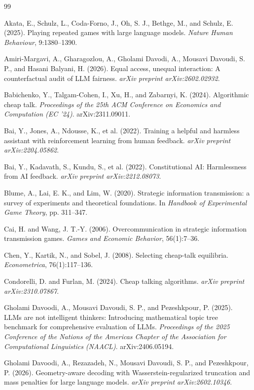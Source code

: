 \documentclass[11pt]{article}
\begin{document}
\begin{thebibliography}{99}
\raggedright

Akata, E., Schulz, L., Coda-Forno, J., Oh, S. J., Bethge, M., and Schulz, E. (2025).
Playing repeated games with large language models.
\emph{Nature Human Behaviour}, 9:1380--1390.

Amiri-Margavi, A., Gharagozlou, A., Gholami Davodi, A., Mousavi Davoudi, S. P., and Hasani Balyani, H. (2026).
Equal access, unequal interaction: A counterfactual audit of LLM fairness.
\emph{arXiv preprint arXiv:2602.02932}.

Babichenko, Y., Talgam-Cohen, I., Xu, H., and Zabarnyi, K. (2024).
Algorithmic cheap talk.
\emph{Proceedings of the 25th ACM Conference on Economics and Computation (EC '24)}. arXiv:2311.09011.

Bai, Y., Jones, A., Ndousse, K., et al. (2022).
Training a helpful and harmless assistant with reinforcement learning from human feedback.
\emph{arXiv preprint arXiv:2204.05862}.

Bai, Y., Kadavath, S., Kundu, S., et al. (2022).
Constitutional AI: Harmlessness from AI feedback.
\emph{arXiv preprint arXiv:2212.08073}.

Blume, A., Lai, E. K., and Lim, W. (2020).
Strategic information transmission: a survey of experiments and theoretical foundations.
In \emph{Handbook of Experimental Game Theory}, pp. 311--347.

Cai, H. and Wang, J. T.-Y. (2006).
Overcommunication in strategic information transmission games.
\emph{Games and Economic Behavior}, 56(1):7--36.

Chen, Y., Kartik, N., and Sobel, J. (2008).
Selecting cheap-talk equilibria.
\emph{Econometrica}, 76(1):117--136.

Condorelli, D. and Furlan, M. (2024).
Cheap talking algorithms.
\emph{arXiv preprint arXiv:2310.07867}.

Gholami Davoodi, A., Mousavi Davoudi, S. P., and Pezeshkpour, P. (2025).
LLMs are not intelligent thinkers: Introducing mathematical topic tree benchmark for comprehensive evaluation of LLMs.
\emph{Proceedings of the 2025 Conference of the Nations of the Americas Chapter of the Association for Computational Linguistics (NAACL)}. arXiv:2406.05194.

Gholami Davoodi, A., Rezazadeh, N., Mousavi Davoudi, S. P., and Pezeshkpour, P. (2026).
Geometry-aware decoding with Wasserstein-regularized truncation and mass penalties for large language models.
\emph{arXiv preprint arXiv:2602.10346}.


\end{thebibliography}
\end{document}
